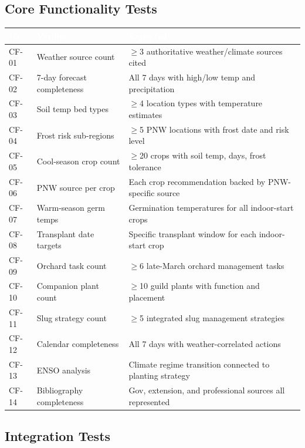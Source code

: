 \documentclass[11pt,letterpaper]{article}
\newcommand{\tableheader}[1]{\textbf{\sffamily\textcolor{white}{#1}}}
\begin{document}
\subsection{Core Functionality Tests}

\begin{center}
\begin{tabularx}{\textwidth}{C{1.2cm}X L{3cm}}
\toprule
{}
\tableheader{ID} & \tableheader{Verifies} & \tableheader{Expected} \\
\midrule
CF-01 & Weather source count & $\geq$3 authoritative weather/climate sources cited \\
CF-02 & 7-day forecast completeness & All 7 days with high/low temp and precipitation \\
CF-03 & Soil temp bed types & $\geq$4 location types with temperature estimates \\
CF-04 & Frost risk sub-regions & $\geq$5 PNW locations with frost date and risk level \\
CF-05 & Cool-season crop count & $\geq$20 crops with soil temp, days, frost tolerance \\
CF-06 & PNW source per crop & Each crop recommendation backed by PNW-specific source \\
CF-07 & Warm-season germ temps & Germination temperatures for all indoor-start crops \\
CF-08 & Transplant date targets & Specific transplant window for each indoor-start crop \\
CF-09 & Orchard task count & $\geq$6 late-March orchard management tasks \\
CF-10 & Companion plant count & $\geq$10 guild plants with function and placement \\
CF-11 & Slug strategy count & $\geq$5 integrated slug management strategies \\
CF-12 & Calendar completeness & All 7 days with weather-correlated actions \\
CF-13 & ENSO analysis & Climate regime transition connected to planting strategy \\
CF-14 & Bibliography completeness & Gov, extension, and professional sources all represented \\
\bottomrule
\end{tabularx}
\end{center}

\subsection{Integration Tests}
\end{document}
